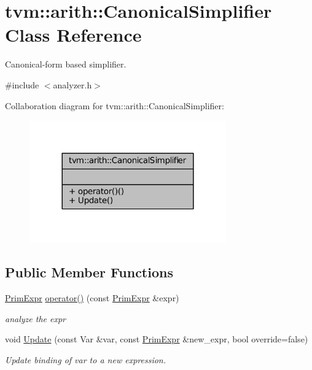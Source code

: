 \hypertarget{classtvm_1_1arith_1_1CanonicalSimplifier}{}\section{tvm\+:\+:arith\+:\+:Canonical\+Simplifier Class Reference}
\label{classtvm_1_1arith_1_1CanonicalSimplifier}


Canonical-\/form based simplifier.  




{\ttfamily \#include $<$analyzer.\+h$>$}



Collaboration diagram for tvm\+:\+:arith\+:\+:Canonical\+Simplifier\+:
\nopagebreak
\begin{figure}[H]
\begin{center}
\leavevmode
\includegraphics[width=240pt]{classtvm_1_1arith_1_1CanonicalSimplifier__coll__graph}
\end{center}
\end{figure}
\subsection*{Public Member Functions}
\begin{DoxyCompactItemize}
\item 
\hyperlink{classtvm_1_1PrimExpr}{Prim\+Expr} \hyperlink{classtvm_1_1arith_1_1CanonicalSimplifier_a2ed4ed7990499ee188e69967afb511c6}{operator()} (const \hyperlink{classtvm_1_1PrimExpr}{Prim\+Expr} \&expr)
\begin{DoxyCompactList}\small\item\em analyze the expr \end{DoxyCompactList}\item 
void \hyperlink{classtvm_1_1arith_1_1CanonicalSimplifier_a7a1994fac0ce831fa375ff5d599c882e}{Update} (const Var \&var, const \hyperlink{classtvm_1_1PrimExpr}{Prim\+Expr} \&new\+\_\+expr, bool override=false)
\begin{DoxyCompactList}\small\item\em Update binding of var to a new expression. \end{DoxyCompactList}\end{DoxyCompactItemize}
